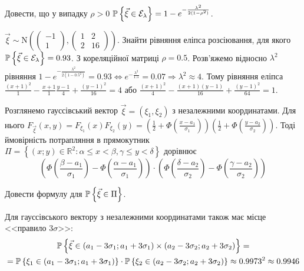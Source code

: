 \begin{exercise}
    Довести, що у випадку $\rho > 0$ $\P\left\{\vec{\xi} \in\mathcal{E}_\lambda\right\} = 
    1 - e^{-\frac{\lambda^2}{2(1-\rho^2)}}$.
\end{exercise}

\begin{example}
    $\vec{\xi} \sim \mathrm{N}\left( \begin{pmatrix}
        -1 \\ 1
    \end{pmatrix}, \begin{pmatrix}
        1 & 2 \\
        2 & 16
    \end{pmatrix}\right)$. Знайти рівняння еліпса розсіювання, для якого \\
    $\P\left\{\vec{\xi} \in \mathcal{E}_\lambda\right\} = 0.93$. З кореляційної матриці $\rho = 0.5$.
    Розв'яжемо відносно $\lambda^2$ рівняння $1 - e^{-\frac{\lambda^2}{2(1-0.5^2)}} = 0.93
    \Leftrightarrow e^{-\frac{\lambda^2}{1.5}} = 0.07 \Rightarrow \lambda^2 \approx 4$. Тому рівняння еліпса
    $\frac{(x+1)^2}{1} - \frac{x+1}{1} \frac{y-1}{4} + \frac{(y-1)^2}{16} = 4$ або 
    $\frac{(x+1)^2}{4} - \frac{(x+1)(y-1)}{16} + \frac{(y-1)^2}{64} = 1$.
\end{example}

Розглянемо гауссівський вектор $\vec{\xi} = (\xi_1, \xi_2)$ з незалежними координатами.
Для нього $F_{\vec{\xi}}(x,y) = F_{\xi_1}(x) F_{\xi_2}(y) = 
\left(\frac{1}{2} + \Phi\left( \frac{x-a_1}{\sigma_1}\right) \right)
\left(\frac{1}{2} + \Phi\left( \frac{y-a_2}{\sigma_2}\right) \right)$.
Тоді ймовірність потрапляння в прямокутник $\Pi = \left\{(x;y)\in\mathbb{R}^2 : \alpha \leq x < \beta, \gamma \leq y < \delta\right\}$
дорівнює $$\left( \Phi\left( \frac{\beta-a_1}{\sigma_1}\right) - \Phi\left( \frac{\alpha-a_1}{\sigma_1}\right)\right) \cdot
\left( \Phi\left( \frac{\delta-a_2}{\sigma_2}\right) - \Phi\left( \frac{\gamma-a_2}{\sigma_2}\right)\right)$$
\begin{exercise}
    Довести формулу для $\P\left\{\vec{\xi}\in\Pi\right\}$.
\end{exercise}
Для гауссівського вектору з незалежними координатами також має місце <<правило $3\sigma$>>:
\begin{gather*}
    \P\left\{\vec{\xi} \in (a_1-3\sigma_1; a_1+3\sigma_1)\times(a_2-3\sigma_2; a_2+3\sigma_2)\right\} = \\
    = \P\left\{\xi_1 \in(a_1-3\sigma_1; a_1+3\sigma_1)\right\}\cdot \P\left\{\xi_2 \in(a_2-3\sigma_2; a_2+3\sigma_2)\right\}
    \approx 0.9973^2 \approx 0.9946
\end{gather*}

